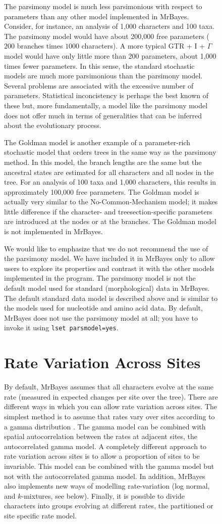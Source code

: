\documentclass[12pt]{book}
\newcommand{\ttt}[1]{\texttt{#1}}
\begin{document}
\begin{figure}[h]
The parsimony model is much less parsimonious with respect to parameters than any other model
implemented in MrBayes. Consider, for instance, an analysis of 1,000 characters and 100 taxa. The
parsimony model would have about 200,000 free parameters ($200$ branches times $1000$ characters).
A more typical GTR + I + $\Gamma$ model would have only little more than 200 parameters, about
1,000 times fewer parameters. In this sense, the standard stochastic models are much more
parsimonious than the parsimony model. Several problems are associated with the excessive number of
parameters.  Statistical inconcistency is perhaps the best known of these but, more fundamentally,
a model like the parsimony model does not offer much in terms of generalities that can be inferred
about the evolutionary process.

The Goldman \citep{goldman93} model is another example of a parameter-rich stochastic model that
orders trees in the same way as the parsimony method. In this model, the branch lengths are the
same but the ancestral states are estimated for all characters and all nodes in the tree. For an
analysis of 100 taxa and 1,000 characters, this results in approximately 100,000 free parameters.
The Goldman model is actually very similar to the No-Common-Mechanism model; it makes little
difference if the character- and treesection-specific parameters are introduced at the nodes or at
the branches. The Goldman model is not implemented in MrBayes.

We would like to emphasize that we do not recommend the use of the parsimony model. We have
included it in MrBayes only to allow users to explore its properties and contrast it with the other
models implemented in the program. The parsimony model is not the default model used for standard
(morphological) data in MrBayes. The default standard data model is described above and is similar
to the models used for nucleotide and amino acid data. By default, MrBayes does not use the
parsimony model at all; you have to invoke it using \ttt{lset parsmodel=yes}.

\section{Rate Variation Across Sites}

By default, MrBayes assumes that all characters evolve at the same rate (measured in expected
changes per site over the tree). There are different ways in which you can allow rate variation
across sites. The simplest method is to assume that rates vary over sites according to a gamma
distribution \citep{yang93}. The gamma model can be combined with spatial autocorrelation between
the rates at adjacent sites, the autocorrelated gamma model. A completely different approach to
rate variation across sites is to allow a proportion of sites to be invariable. This model can be
combined with the gamma model but not with the autocorrelated gamma model. In addition, MrBayes
also implements new ways of modelling rate-variation (log normal, and $k$-mixtures, see below).
Finally, it is possible to divide characters into groups evolving at different rates, the
partitioned or site specific rate model.


\end{figure}
\end{document}
